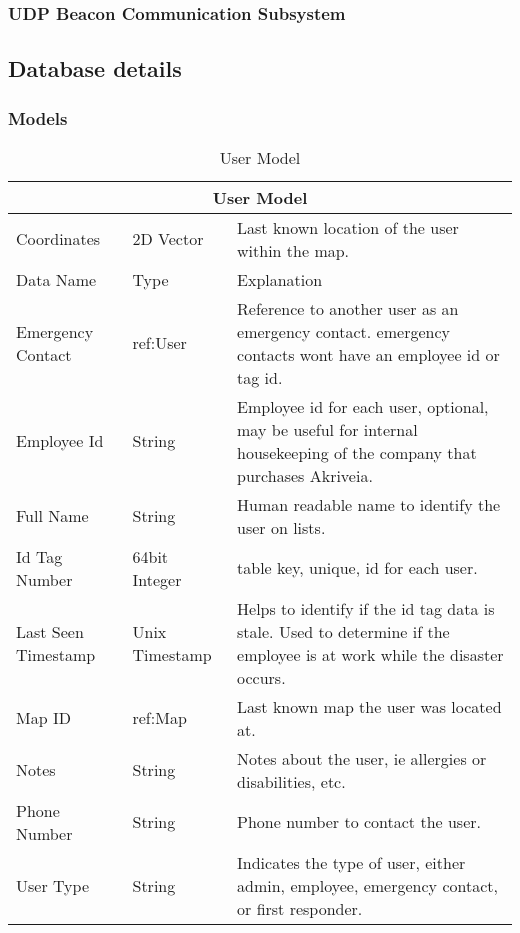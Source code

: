 \bigskip
\subsubsection{UDP Beacon Communication Subsystem}

\bigskip
\subsection{Database details}

\bigskip
\subsubsection{Models}


\begin{table}[H]
\centering
\begin{tabular}{| m{3cm} | m{3cm} | m{9.5cm} |}
	\hline
	\multicolumn{3}{|c|}{User Model} \\
	\hline
	Coordinates & 2D Vector & Last known location of the user within the map. \\
	\hline
	Data Name & Type & Explanation \\
	\hline
	Emergency Contact & ref:User & Reference to another user as an emergency contact. emergency contacts wont have an employee id or tag id. \\
	\hline
	Employee Id & String & Employee id for each user, optional, may be useful for internal housekeeping of the company that purchases Akriveia. \\
	\hline
	Full Name & String & Human readable name to identify the user on lists. \\
	\hline
	Id Tag Number & 64bit Integer & table key, unique, id for each user. \\
	\hline
	Last Seen Timestamp & Unix Timestamp & Helps to identify if the id tag data is stale. Used to determine if the employee is at work while the disaster occurs. \\
	\hline
	Map ID & ref:Map & Last known map the user was located at. \\
	\hline
	Notes & String & Notes about the user, ie allergies or disabilities, etc. \\
	\hline
	Phone Number & String & Phone number to contact the user. \\
	\hline
	User Type & String & Indicates the type of user, either admin, employee, emergency contact, or first responder. \\
	\hline
\end{tabular}
\caption{User Model}
\end{table}

